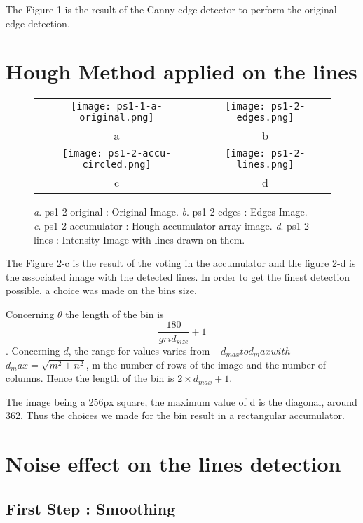 \documentclass[a4paper,11pt]{article}
\begin{document}
The Figure 1 is the result of the Canny edge detector to perform the original edge detection.

\section{Hough Method applied on the lines}

 \begin{figure}[H]
\begin{center}
\begin{tabular}{cc}
	\texttt{[image: ps1-1-a-original.png]}&
	\texttt{[image: ps1-2-edges.png]}\\
	a&b\\
	\texttt{[image: ps1-2-accu-circled.png]}&
	\texttt{[image: ps1-2-lines.png]}\\
	c&d\\
\end{tabular}
\end{center}
\caption{ 
\textit{a}. ps1-2-original : Original Image.  \textit{b}. ps1-2-edges : Edges Image. \\
\textit{c}. ps1-2-accumulator : Hough accumulator array image. \textit{d}. ps1-2-lines : Intensity Image with lines drawn on them.}
\label{ps1-2}
\end{figure}

The Figure 2-c is the result of the voting in the accumulator and the figure 2-d is the associated image with the detected lines. 
In order to get the finest detection possible, a choice was made on the bins size.

Concerning $\theta$  the length of the bin is $$\frac{180}{grid_{size}} + 1$$.
Concerning $d$, the range for values varies from $-d_{max} to {d_max} with $$d_max = \sqrt{m^2+n^2}$, m the number of rows of the image and the number of columns. Hence the length of the bin is $2 \times d_{max}+1$.

The image being a 256px square, the maximum value of d is the diagonal, around 362. Thus the choices we made for the bin result in a rectangular accumulator.

\section{Noise effect on the lines detection}


\subsection{First Step : Smoothing}
\end{document}
